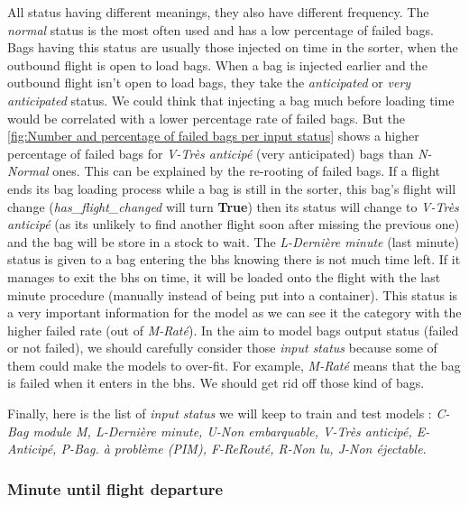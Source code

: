 \documentclass[12pt]{article}
\begin{document}
All status having different meanings, they also have different frequency. The \textit{normal} status is the most often used and has a low percentage of failed bags. Bags having this status are usually those injected on time in the sorter, when the outbound flight is open to load bags. When a bag is injected earlier and the outbound flight isn't open to load bags, they take the \textit{anticipated} or \textit{very anticipated} status. We could think that injecting a bag much before loading time would be correlated with a lower percentage rate of failed bags. But the \autoref{fig:Number and percentage of failed bags per input status} shows a higher percentage of failed bags for \textit{V-Très anticipé} (very anticipated) bags than \textit{N-Normal} ones. This can be explained by the re-rooting of failed bags. If a flight ends its bag loading process while a bag is still in the sorter, this bag's flight will change (\textit{has\_flight\_changed} will turn \textbf{True}) then its status will change to \textit{V-Très anticipé} (as its unlikely to find another flight soon after missing the previous one) and the bag will be store in a stock to wait.
\noindent The \textit{L-Dernière minute} (last minute) status is given to a bag entering the \acrshort{bhs} knowing there is not much time left. If it manages to exit the \acrshort{bhs} on time, it will be loaded onto the flight with the last minute procedure (manually instead of being put into a container). This status is a very important information for the model as we can see it the category with the higher failed rate (out of \textit{M-Raté}).
\noindent In the aim to model bags output status (failed or not failed), we should carefully consider those \textit{input status} because some of them could make the models to over-fit. For example, \textit{M-Raté} means that the bag is failed when it enters in the \acrshort{bhs}. We should get rid off those kind of bags. 


Finally, here is the list of \textit{input status} we will keep to train and test models : \textit{C-Bag module M, L-Dernière minute, U-Non embarquable, V-Très anticipé, E-Anticipé, P-Bag. à problème (PIM), F-ReRouté, R-Non lu, J-Non éjectable}.


\newpage
\subsubsection{Minute until flight departure}
\end{document}

